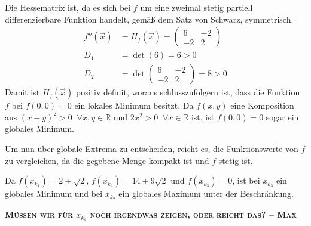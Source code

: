 \documentclass[10pt,a4paper,parskip=half]{scrartcl}
\begin{document}
Die Hessematrix ist, da es sich bei $f$ um eine zweimal stetig partiell differenzierbare Funktion handelt, gemäß dem Satz von Schwarz, symmetrisch.
\begin{align*}
f''(\vec x) &= H_f(\vec x) =  \begin{pmatrix}6 & -2 \\ -2 & 2\end{pmatrix}\\
D_1 &= \det (6) = 6 > 0\\
D_2 &= \det \begin{pmatrix} 6 & -2 \\ -2 & 2\end{pmatrix} = 8 > 0
\end{align*}
Damit ist $H_f(\vec x)$ positiv definit, woraus schlusszufolgern ist, dass die Funktion $f$ bei $f(0,0) = 0$ ein lokales Minimum besitzt. Da $f(x,y)$ eine Komposition aus $(x-y)^2 > 0 \; \; \forall x,y \in \mathbb{R}$ und $2x^2 > 0 \; \; \forall x \in \mathbb{R}$ ist, ist $f(0,0) = 0$ sogar ein globales Minimum.

Um nun über globale Extrema zu entscheiden, reicht es, die Funktionswerte von $f$ zu vergleichen, da die gegebene Menge kompakt ist und $f$ stetig ist.

Da $f(x_{k_1}) = 2 + \sqrt 2$, $f(x_{k_2}) = 14+9 \sqrt{2}$ und $f(x_{k_3}) = 0$, ist bei $x_{k_3}$ ein globales Minimum und bei $x_{k_2}$ ein globales Maximum unter der Beschränkung.

\textbf{\textsc{Müssen wir für $x_{k_1}$ noch irgendwas zeigen, oder reicht das? -- Max}}
\end{document}
